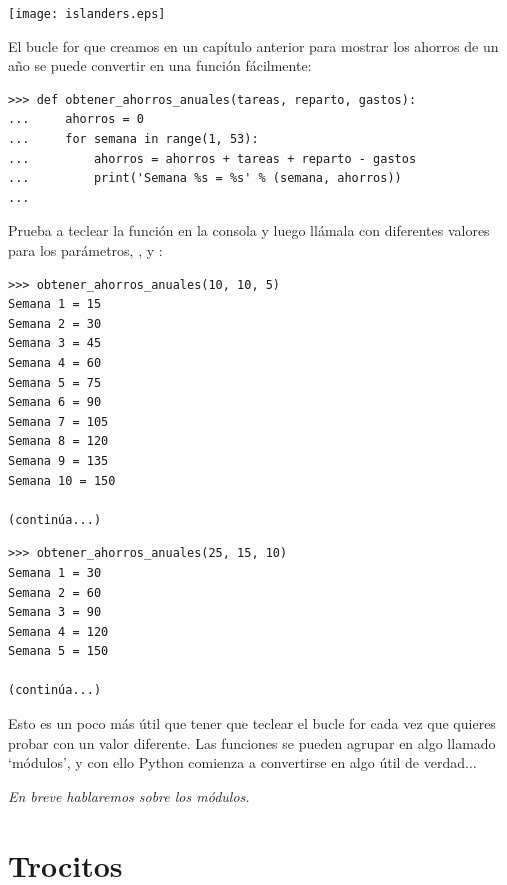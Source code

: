 \begin{center}
\texttt{[image: islanders.eps]}
\end{center}

El bucle for que creamos en un capítulo anterior para mostrar los ahorros de un año se puede convertir en una función fácilmente:

\begin{listing}
\begin{verbatim}
>>> def obtener_ahorros_anuales(tareas, reparto, gastos):
...     ahorros = 0
...     for semana in range(1, 53):
...         ahorros = ahorros + tareas + reparto - gastos
...         print('Semana %s = %s' % (semana, ahorros))
...
\end{verbatim}
\end{listing}

Prueba a teclear la función en la consola y luego llámala con diferentes valores para los parámetros, ,  y :

\begin{listing}
\begin{verbatim}
>>> obtener_ahorros_anuales(10, 10, 5)
Semana 1 = 15
Semana 2 = 30
Semana 3 = 45
Semana 4 = 60
Semana 5 = 75
Semana 6 = 90
Semana 7 = 105
Semana 8 = 120
Semana 9 = 135
Semana 10 = 150

(continúa...)

\end{verbatim}
\end{listing}

\begin{listing}
\begin{verbatim}
>>> obtener_ahorros_anuales(25, 15, 10)
Semana 1 = 30
Semana 2 = 60
Semana 3 = 90
Semana 4 = 120
Semana 5 = 150

(continúa...)

\end{verbatim}
\end{listing}

Esto es un poco más útil que tener que teclear el bucle for cada vez que quieres probar con un valor diferente.  Las funciones se pueden agrupar en algo llamado `módulos', y con ello Python comienza a convertirse en algo útil de verdad$\ldots$
\par
\noindent
\emph{En breve hablaremos sobre los módulos.}

\section{Trocitos}

